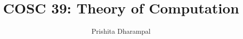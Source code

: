 \title{COSC 39: Theory of Computation}

\author{Prishita Dharampal}
\date{}
\maketitle
\vspace{-0.3in}
